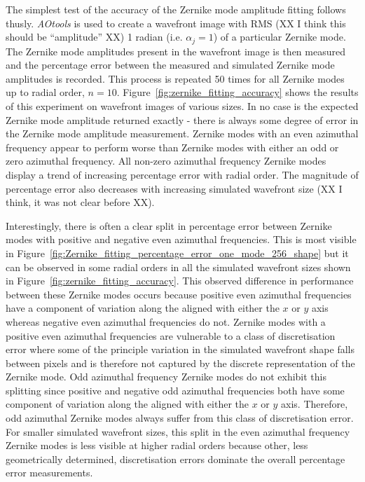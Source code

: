 The simplest test of the accuracy of the Zernike mode amplitude fitting 
follows thusly. \textit{AOtools} is used to create a wavefront image
with RMS (XX I think this should be ``amplitude'' XX) 
1 radian (i.e. $\alpha_{j} = 1$) of a particular Zernike mode. The Zernike 
mode amplitudes present in the wavefront image is then measured and the 
percentage error between the measured and simulated Zernike mode amplitudes 
is recorded. This process is repeated 50 times for all Zernike modes up to 
radial order, $n = 10$. Figure~\ref{fig:zernike_fitting_accuracy} shows the 
results of this experiment on wavefront images of various sizes. In no case 
is the expected Zernike mode amplitude returned exactly - there is always 
some degree of error in the Zernike mode amplitude measurement. Zernike modes 
with an even azimuthal frequency appear to perform worse than Zernike modes 
with either an odd or zero azimuthal frequency. All non-zero azimuthal 
frequency Zernike modes display a trend of increasing percentage error with 
radial order. The magnitude of percentage error also decreases with
increasing simulated 
wavefront size (XX I think, it was not clear before XX). 

Interestingly, there is often a clear split in percentage error between 
Zernike modes with positive and negative even azimuthal frequencies. This is most visible in 
Figure~\ref{fig:Zernike_fitting_percentage_error_one_mode_256_shape} but it 
can be observed in some radial orders in all the simulated wavefront sizes 
shown in Figure~\ref{fig:zernike_fitting_accuracy}. This observed difference 
in performance between these Zernike modes occurs because positive even 
azimuthal frequencies have a component of variation along the aligned with 
either the $x$ or $y$ axis whereas negative even azimuthal frequencies do 
not. Zernike modes with a positive even azimuthal frequencies are vulnerable 
to a class of discretisation error where some of the principle variation in 
the simulated wavefront shape falls between pixels and is therefore not 
captured by the discrete representation of the Zernike mode. Odd azimuthal 
frequency Zernike modes do not exhibit this splitting since positive and 
negative odd azimuthal frequencies both have some component of variation 
along the aligned with either the $x$ or $y$ axis. Therefore, odd azimuthal 
Zernike modes always suffer from this class of discretisation error. For 
smaller simulated wavefront sizes, this split in the even azimuthal frequency 
Zernike modes is less visible at higher radial orders because other, less 
geometrically determined, discretisation errors dominate the overall 
percentage error measurements.

